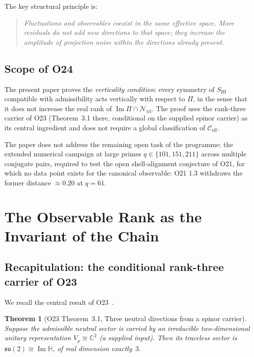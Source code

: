 \documentclass[11pt,a4paper]{article}
\newtheorem{theorem}{Theorem}[section]
\newcommand{\Ntrl}{\mathcal{N}_{\mathrm{trl}}}
\newcommand{\SBI}{S_{\mathrm{BI}}}
\newcommand{\ImH}{\operatorname{Im}\mathbb{H}}
\begin{document}
      The key structural principle is:
      \begin{quote}
        \emph{Fluctuations and observables coexist in the same effective space.
        More residuals do not add new directions to that space; they increase the amplitude of
        projection noise within the directions already present.}
      \end{quote}

    \subsection{Scope of O24}
      \label{sec:scope}

      The present paper proves the \emph{verticality condition}: every symmetry of $\SBI$
      compatible with admissibility acts vertically with respect to $\Pi$, in the sense that it
      does not increase the real rank of $\operatorname{Im}\Pi \cap \Ntrl$.
      The proof uses the rank-three carrier of O23 (Theorem~3.1 there, conditional on the
      supplied spinor carrier) as its central ingredient and
      does not require a global classification of $\mathcal{C}_{\mathrm{eff}}$.

      The paper does not address the remaining open task of the programme: the extended numerical
      campaign at large primes $q \in \{101, 151, 211\}$ across multiple conjugate pairs, required
      to test the open shell-alignment conjecture of O21, for which no data point
      exists for the canonical observable: O21 1.3 withdraws the former distance $\approx 0.20$ at
      $q = 61$.

  \section{The Observable Rank as the Invariant of the Chain}
    \label{sec:rank}

    \subsection{Recapitulation: the conditional rank-three carrier of O23}
      \label{sec:o23recap}

      We recall the central result of O23~\cite{Beau2026a27}.

      \begin{theorem}[O23 Theorem~3.1, Three neutral directions from a spinor carrier]
        \label{thm:o23}
        Suppose the admissible neutral sector is carried by an irreducible two-dimensional
        unitary representation $V_\rho \cong \mathbb{C}^2$ (a supplied input).
        Then its traceless sector is $\mathfrak{su}(2) \cong \ImH$, of real dimension
        exactly~$3$.
      \end{theorem}
\end{document}
